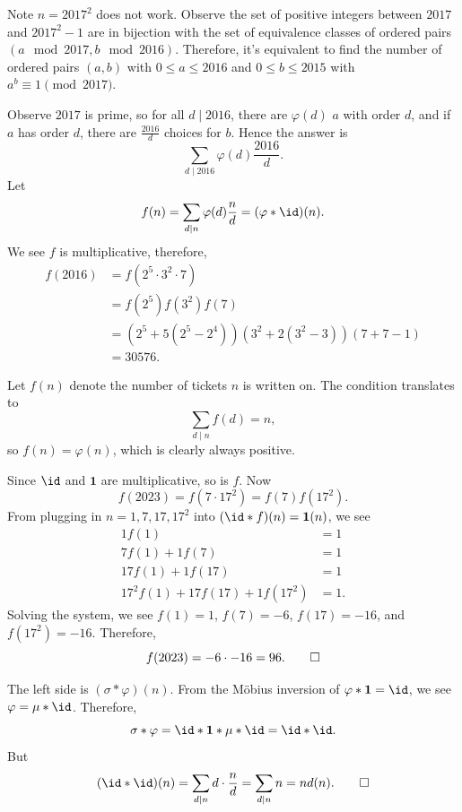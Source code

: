 \documentclass[11pt]{scrartcl}
\begin{document}
\begin{solution}{}
	Note $n = 2017^2$ does not work. Observe the set of positive integers between $2017$ and $2017^2 - 1$ are in bijection with the set of equivalence classes of ordered pairs $(a \mod{2017},b \mod{2016})$. Therefore, it's equivalent to find the number of ordered pairs $(a,b)$ with $0 \le a \le 2016$ and $0 \le b \le 2015$ with $a^b \equiv 1 \pmod{2017}$.
	
	Observe $2017$ is prime, so for all $d \mid 2016$, there are $\varphi(d)$ $a$ with order $d$, and if $a$ has order $d$, there are $\frac{2016}d$ choices for $b$. Hence the answer is
	\[\sum_{d \mid 2016}\varphi(d)\frac{2016}{d}.\]
	Let
	\[f(n) = \sum_{d \mid n}\varphi(d)\frac{n}{d} = (\varphi \ast \id)(n).\]
	We see $f$ is multiplicative, therefore,
	\begin{align*}
		f(2016) &= f(2^5 \cdot 3^2 \cdot 7) \\
		&= f(2^5)f(3^2)f(7) \\
		&= \left(2^5 + 5(2^5 - 2^4)\right)\left(3^2 + 2(3^2 - 3)\right)\left(7 + 7 - 1\right) \\
		&= 30576.
	\end{align*}
\end{solution}

\begin{solution}{}
	Let $f(n)$ denote the number of tickets $n$ is written on. The condition translates to
	\[\sum_{d \mid n}f(d) = n,\]
	so $f(n) = \varphi(n)$, which is clearly always positive.
\end{solution}

\begin{solution}{}
	Since $\id$ and $\mathbf 1$ are multiplicative, so is $f$. Now
	\[f(2023) = f(7 \cdot 17^2) = f(7)f(17^2).\]
	From plugging in $n = 1,7,17,17^2$ into $(\id \ast f)(n) = \mathbf 1(n)$, we see
	\begin{align*}
		1f(1) &= 1 \\
		7f(1) + 1f(7) &= 1\\
		17f(1) + 1f(17) &= 1\\
		17^2f(1) + 17f(17) + 1f(17^2) &= 1.
	\end{align*}
	Solving the system, we see $f(1) = 1$, $f(7) = -6$, $f(17) = -16$, and $f(17^2) = -16$. Therefore,
	\[f(2023) = -6 \cdot -16 = 96. \qedhere\]
\end{solution}

\begin{solution}{}
	The left side is $(\sigma \ast \varphi)(n)$. From the M\"obius inversion of $\varphi \ast \mathbf 1 = \id$, we see $\varphi = \mu \ast \id$. Therefore,
	\[\sigma \ast \varphi = \id \ast \mathbf 1 \ast \mu \ast \id = \id \ast \id.\]
	But
	\[(\id \ast \id)(n) = \sum_{d \mid n}d \cdot \frac{n}{d} = \sum_{d \mid n}n = nd(n). \qedhere\]
\end{solution}
\end{document}
